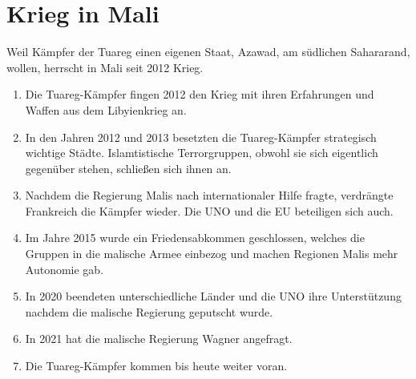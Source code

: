\documentclass{article}
\begin{document}
\section{Krieg in Mali} 
Weil Kämpfer der Tuareg einen eigenen Staat, Azawad, am südlichen Sahararand, wollen, herrscht in Mali seit 2012 Krieg. 
\begin{enumerate}
 \item Die Tuareg-Kämpfer fingen 2012 den Krieg mit ihren Erfahrungen und Waffen aus dem Libyienkrieg an.
 \item In den Jahren 2012 und 2013 besetzten die Tuareg-Kämpfer strategisch wichtige Städte. Islamtistische Terrorgruppen, obwohl sie sich eigentlich gegenüber stehen, schließen sich ihnen an. 
 \item Nachdem die Regierung Malis nach internationaler Hilfe fragte, verdrängte Frankreich die Kämpfer wieder. Die UNO und die EU beteiligen sich auch.
 \item Im Jahre 2015 wurde ein Friedensabkommen geschlossen, welches die Gruppen in die malische Armee einbezog und machen Regionen Malis mehr Autonomie gab. 
 \item In 2020 beendeten unterschiedliche Länder und die UNO ihre Unterstützung nachdem die malische Regierung geputscht wurde.
 \item In 2021 hat die malische Regierung Wagner angefragt.
 \item Die Tuareg-Kämpfer kommen bis heute weiter voran. 
\end{enumerate} 
\end{document}
